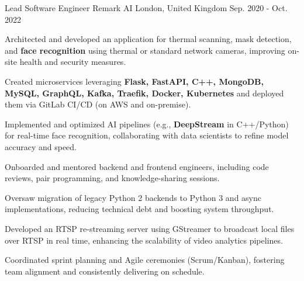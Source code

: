 \begin{cventries}
   \cventry
    {Lead Software Engineer} %
    {Remark AI} %
    {London,  United Kingdom} %
    {Sep. 2020 - Oct. 2022} %
    {
      \begin{cvitems}
        \item {Architected and developed an application for thermal scanning, mask detection, and \textbf{face recognition} using thermal or standard network cameras, improving on-site health and security measures.}
        \item {Created microservices leveraging \textbf{Flask, FastAPI, C++, MongoDB, MySQL, GraphQL, Kafka, Traefik, Docker, Kubernetes} and deployed them via GitLab CI/CD (on AWS and on-premise).}
        \item {Implemented and optimized AI pipelines (e.g., \textbf{DeepStream} in C++/Python) for real-time face recognition, collaborating with data scientists to refine model accuracy and speed.}
        \item {Onboarded and mentored backend and frontend engineers, including code reviews, pair programming, and knowledge-sharing sessions.}
        \item {Oversaw migration of legacy Python 2 backends to Python 3 and async implementations, reducing technical debt and boosting system throughput.}
        \item {Developed an RTSP re-streaming server using GStreamer to broadcast local files over RTSP in real time, enhancing the scalability of video analytics pipelines.}
        \item {Coordinated sprint planning and Agile ceremonies (Scrum/Kanban), fostering team alignment and consistently delivering on schedule.}
      \end{cvitems}
    }


\end{cventries}
